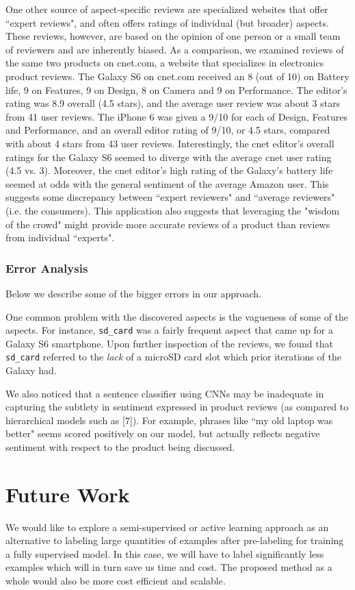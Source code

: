 \documentclass{article} %
\begin{document}
One other source of aspect-specific reviews are specialized websites that offer ``expert reviews", and often offers ratings of individual (but broader) aspects. These reviews, however, are based on the opinion of one person or a small team of reviewers and are inherently biased. As a comparison, we examined reviews of the same two products on cnet.com, a website that specializes in electronics product reviews. The Galaxy S6 on cnet.com received an 8 (out of 10) on Battery life, 9 on Features, 9 on Design, 8 on Camera and 9 on Performance. The editor's rating was 8.9 overall (4.5 stars), and the average user review was about 3 stars from 41 user reviews. The iPhone 6 was given a 9/10 for each of Design, Features and Performance, and an overall editor rating of 9/10, or 4.5 stars, compared with about 4 stars from 43 user reviews. Interestingly, the cnet editor's overall ratings for the Galaxy S6 seemed to diverge with the average cnet user rating (4.5 vs. 3). Moreover, the cnet editor's high rating of the Galaxy's battery life seemed at odds with the general sentiment of the average Amazon user. This suggests some discrepancy between ``expert reviewers" and ``average reviewers" (i.e. the consumers). This application also suggests that leveraging the "wisdom of the crowd" might provide more accurate reviews of a product than reviews from individual ``experts".

\subsubsection{Error Analysis}
Below we describe some of the bigger errors in our approach.

One common problem with the discovered aspects is the vagueness of some of the aspects. For instance, \texttt{sd\_card} was a fairly frequent aspect that came up for a Galaxy S6 smartphone. Upon further inspection of the reviews, we found that \texttt{sd\_card} referred to the \textit{lack} of a microSD card slot which prior iterations of the Galaxy had.

We also noticed that a sentence classifier using CNNs may be inadequate in capturing the subtlety in sentiment expressed in product reviews (as compared to hierarchical models such as [7]). For example, phrases like ``my old laptop was better" seems scored positively on our model, but actually reflects negative sentiment with respect to the product being discussed.

\section{Future Work}
We would like to explore a semi-supervised or active learning approach as an alternative to labeling large quantities of examples after pre-labeling for training a fully supervised model. In this case, we will have to label significantly less examples which will in turn save us time and cost. The proposed method as a whole would also be more cost efficient and scalable.
\end{document}
